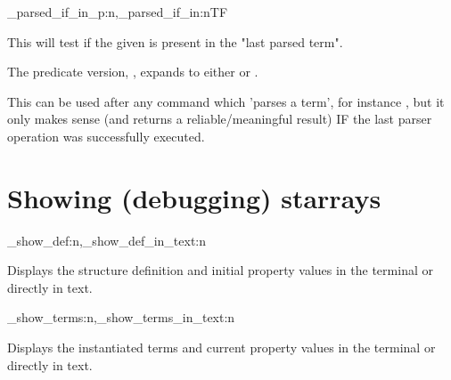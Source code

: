 \documentclass[10pt]{article}
\begin{document}
\begin{codedescribe}[code,EXP,new=2023/05/20]{\starray_parsed_if_in_p:n,\starray_parsed_if_in:nTF}
\begin{codesyntax}%
\end{codesyntax}
This will test if the given  is present in the "last parsed term". 
\end{codedescribe}
\begin{tsremark}
The predicate version, , expands to either  or .
\end{tsremark}
\begin{tsremark}
This can be used after any command which 'parses a term', for instance , but it only makes sense (and returns a reliable/meaningful result) IF the last parser operation was successfully executed.
\end{tsremark}

\section{Showing (debugging) starrays }\label{pack:show}

\begin{codedescribe}{\starray_show_def:n,\starray_show_def_in_text:n}
\begin{codesyntax}%
\end{codesyntax}
\end{codedescribe}
Displays the  structure definition and initial property values in the terminal or directly in text.


\begin{codedescribe}{\starray_show_terms:n,\starray_show_terms_in_text:n}
\begin{codesyntax}%
\end{codesyntax}
\end{codedescribe}
Displays the  instantiated terms and current  property values in the terminal or directly in text.
\end{document}
